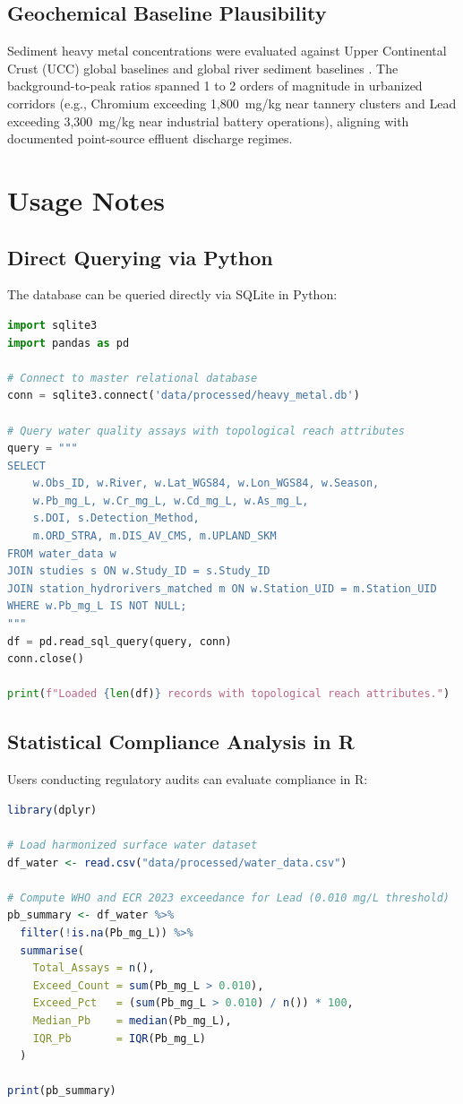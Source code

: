 \documentclass[11pt,a4paper]{article}
\begin{document}
\subsection*{Geochemical Baseline Plausibility}
Sediment heavy metal concentrations were evaluated against Upper Continental Crust (UCC) global baselines \citep{Wedepohl1995} and global river sediment baselines \citep{Gaillardet2014}. The background-to-peak ratios spanned 1 to 2 orders of magnitude in urbanized corridors (e.g., Chromium exceeding 1,800~mg/kg near tannery clusters and Lead exceeding 3,300~mg/kg near industrial battery operations), aligning with documented point-source effluent discharge regimes.

\section*{Usage Notes}

\subsection*{Direct Querying via Python}
The database can be queried directly via SQLite in Python:

\begin{lstlisting}[language=Python]
import sqlite3
import pandas as pd

# Connect to master relational database
conn = sqlite3.connect('data/processed/heavy_metal.db')

# Query water quality assays with topological reach attributes
query = """
SELECT 
    w.Obs_ID, w.River, w.Lat_WGS84, w.Lon_WGS84, w.Season,
    w.Pb_mg_L, w.Cr_mg_L, w.Cd_mg_L, w.As_mg_L,
    s.DOI, s.Detection_Method,
    m.ORD_STRA, m.DIS_AV_CMS, m.UPLAND_SKM
FROM water_data w
JOIN studies s ON w.Study_ID = s.Study_ID
JOIN station_hydrorivers_matched m ON w.Station_UID = m.Station_UID
WHERE w.Pb_mg_L IS NOT NULL;
"""
df = pd.read_sql_query(query, conn)
conn.close()

print(f"Loaded {len(df)} records with topological reach attributes.")
\end{lstlisting}

\subsection*{Statistical Compliance Analysis in R}
Users conducting regulatory audits can evaluate compliance in R:

\begin{lstlisting}[language=R]
library(dplyr)

# Load harmonized surface water dataset
df_water <- read.csv("data/processed/water_data.csv")

# Compute WHO and ECR 2023 exceedance for Lead (0.010 mg/L threshold)
pb_summary <- df_water %>%
  filter(!is.na(Pb_mg_L)) %>%
  summarise(
    Total_Assays = n(),
    Exceed_Count = sum(Pb_mg_L > 0.010),
    Exceed_Pct   = (sum(Pb_mg_L > 0.010) / n()) * 100,
    Median_Pb    = median(Pb_mg_L),
    IQR_Pb       = IQR(Pb_mg_L)
  )

print(pb_summary)
\end{lstlisting}
\end{document}
